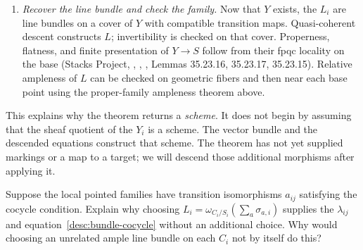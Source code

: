 \begin{enumerate}
\item \emph{Recover the line bundle and check the family.}
Now that $Y$ exists, the $L_i$ are line bundles on a cover of $Y$ with
compatible transition maps. Quasi-coherent descent constructs $L$;
invertibility is checked on that cover. Properness, flatness, and finite
presentation of $Y\to S$ follow from their fpqc locality on the base
(Stacks Project, , , ,
Lemmas 35.23.16, 35.23.17, 35.23.15). Relative ampleness of $L$
can be checked on geometric fibers and then near each base point
using the proper-family ampleness theorem above.
\end{enumerate}

This explains why the theorem returns a \emph{scheme}. It does not
begin by assuming that the sheaf quotient of the $Y_i$ is a scheme.
The vector bundle and the descended equations construct that scheme.
The theorem has not yet supplied markings or a map to a target; we
will descend those additional morphisms after applying it.

\begin{Ej}\label{desc:exercise-polarization}
Suppose the local pointed families have transition isomorphisms
$a_{ij}$ satisfying the cocycle condition. Explain why choosing
$L_i=\omega_{C_i/S_i}(\sum_a\sigma_{a,i})$ supplies the
$\lambda_{ij}$ and equation~\eqref{desc:bundle-cocycle} without an
additional choice. Why would choosing an unrelated ample line bundle
on each $C_i$ not by itself do this?
\end{Ej}
